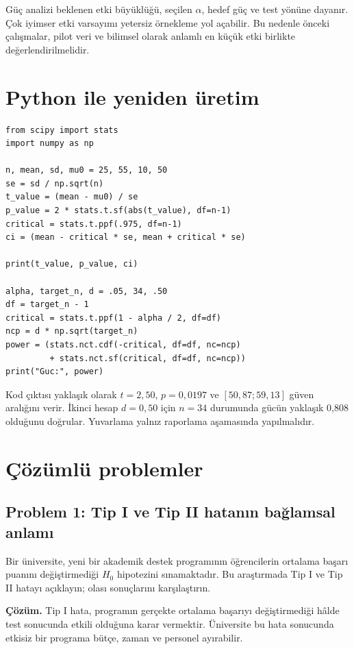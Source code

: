 Güç analizi beklenen etki büyüklüğü, seçilen $\alpha$, hedef güç ve test
yönüne dayanır. Çok iyimser etki varsayımı yetersiz örnekleme yol açabilir.
Bu nedenle önceki çalışmalar, pilot veri ve bilimsel olarak anlamlı en küçük
etki birlikte değerlendirilmelidir.

\section{Python ile yeniden üretim}

\begin{softwarebox}
\begin{lstlisting}
from scipy import stats
import numpy as np

n, mean, sd, mu0 = 25, 55, 10, 50
se = sd / np.sqrt(n)
t_value = (mean - mu0) / se
p_value = 2 * stats.t.sf(abs(t_value), df=n-1)
critical = stats.t.ppf(.975, df=n-1)
ci = (mean - critical * se, mean + critical * se)

print(t_value, p_value, ci)

alpha, target_n, d = .05, 34, .50
df = target_n - 1
critical = stats.t.ppf(1 - alpha / 2, df=df)
ncp = d * np.sqrt(target_n)
power = (stats.nct.cdf(-critical, df=df, nc=ncp)
         + stats.nct.sf(critical, df=df, nc=ncp))
print("Guc:", power)
\end{lstlisting}
Kod çıktısı yaklaşık olarak $t=2{,}50$, $p=0{,}0197$ ve
$[50{,}87;59{,}13]$ güven aralığını verir. İkinci hesap $d=0{,}50$ için
$n=34$ durumunda gücün yaklaşık 0,808 olduğunu doğrular. Yuvarlama yalnız
raporlama aşamasında yapılmalıdır.
\end{softwarebox}

\section{Çözümlü problemler}

\subsection*{Problem 1: Tip I ve Tip II hatanın bağlamsal anlamı}

Bir üniversite, yeni bir akademik destek programının öğrencilerin ortalama
başarı puanını değiştirmediği $H_0$ hipotezini sınamaktadır. Bu araştırmada
Tip I ve Tip II hatayı açıklayın; olası sonuçlarını karşılaştırın.

\textbf{Çözüm.} Tip I hata, programın gerçekte ortalama başarıyı
değiştirmediği hâlde test sonucunda etkili olduğuna karar vermektir. Üniversite
bu hata sonucunda etkisiz bir programa bütçe, zaman ve personel ayırabilir.

